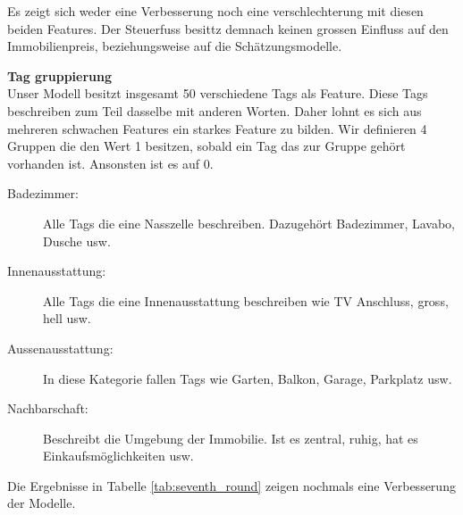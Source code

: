 \begin{table}[ht]
\centering
{}
\caption{Ergebnisse mit Einbezug des Steuerfuss}
\label{tab:sixth_round}
\end{table}

Es zeigt sich weder eine Verbesserung noch eine verschlechterung mit diesen beiden Features. Der Steuerfuss besittz demnach keinen grossen Einfluss auf den Immobilienpreis, beziehungsweise auf die Schätzungsmodelle.

\textbf{Tag gruppierung}\\
Unser Modell besitzt insgesamt 50 verschiedene Tags als Feature. Diese Tags beschreiben zum Teil dasselbe mit anderen Worten. Daher lohnt es sich aus mehreren schwachen Features ein starkes Feature zu bilden. Wir definieren 4 Gruppen die den Wert 1 besitzen, sobald ein Tag das zur Gruppe gehört vorhanden ist. Ansonsten ist es auf 0.

\begin{description}
\item[Badezimmer:] Alle Tags die eine Nasszelle beschreiben. Dazugehört Badezimmer, Lavabo, Dusche usw.
\item[Innenausstattung:] Alle Tags die eine Innenausstattung beschreiben wie TV Anschluss, gross, hell usw.
\item[Aussenausstattung:] In diese Kategorie fallen Tags wie Garten, Balkon, Garage, Parkplatz usw.
\item[Nachbarschaft:] Beschreibt die Umgebung der Immobilie. Ist es zentral, ruhig, hat es Einkaufsmöglichkeiten usw.
\end{description}

Die Ergebnisse in Tabelle \ref{tab:seventh_round} zeigen nochmals eine Verbesserung der Modelle.

\begin{table}[ht]
\centering
{}
\caption{Ergebnisse mit gruppierten Tags}
\label{tab:seventh_round}
\end{table}

